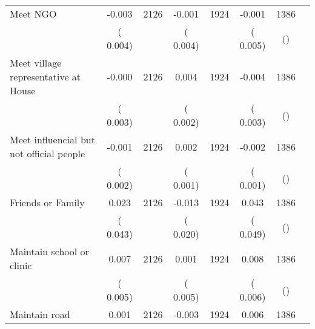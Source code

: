 \begin{tabular}{l*{6}{c}}
Meet NGO        &             -0.003      &       2126       &             -0.001      &       1924       &             -0.001      &       1386  &  &              \\
                       &       (       0.004)            &                               &       (       0.004)            &                               &       (       0.005)            &       () &                  \\
Meet village representative at House        &             -0.000      &       2126       &              0.004      &       1924       &             -0.004      &       1386  &  &              \\
                       &       (       0.003)            &                               &       (       0.002)            &                               &       (       0.003)            &       () &                  \\
Meet influencial but not official people        &             -0.001      &       2126       &              0.002      &       1924       &             -0.002      &       1386  &  &              \\
                       &       (       0.002)            &                               &       (       0.001)            &                               &       (       0.001)            &       () &                  \\
Friends or Family        &              0.023      &       2126       &             -0.013      &       1924       &              0.043      &       1386  &  &              \\
                       &       (       0.043)            &                               &       (       0.020)            &                               &       (       0.049)            &       () &                  \\
Maintain school or clinic        &              0.007      &       2126       &              0.001      &       1924       &              0.008      &       1386  &  &              \\
                       &       (       0.005)            &                               &       (       0.005)            &                               &       (       0.006)            &       () &                  \\
Maintain road        &              0.001      &       2126       &             -0.003      &       1924       &              0.006      &       1386  &  &              \\

\end{tabular}
